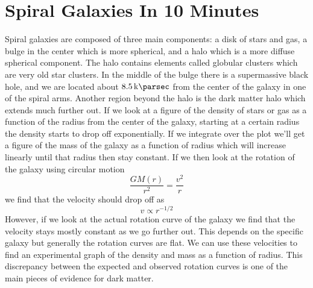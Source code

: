 \section{Spiral Galaxies In 10 Minutes}
Spiral galaxies are composed of three main components: a disk of stars and gas, a bulge in the center which is more spherical, and a halo which is a more diffuse spherical component. The halo contains elements called globular clusters which are very old star clusters. In the middle of the bulge there is a supermassive black hole, and we are located about \(\qty{8.5}{\kilo\parsec}\) from the center of the galaxy in one of the spiral arms. Another region beyond the halo is the dark matter halo which extends much further out. If we look at a figure of the density of stars or gas as a function of the radius from the center of the galaxy, starting at a certain radius the density starts to drop off exponentially. If we integrate over the plot we'll get a figure of the mass of the galaxy as a function of radius which will increase linearly until that radius then stay constant. If we then look at the rotation of the galaxy using circular motion
\begin{equation}
    \frac{GM(r)}{r^2} = \frac{v^2}{r}
\end{equation}
we find that the velocity should drop off as
\begin{equation}
    v  \propto r^{-1/2}
\end{equation}
However, if we look at the actual rotation curve of the galaxy we find that the velocity stays mostly constant as we go further out. This depends on the specific galaxy but generally the rotation curves are flat. We can use these velocities to find an experimental graph of the density and mass as a function of radius. This discrepancy between the expected and observed rotation curves is one of the main pieces of evidence for dark matter.